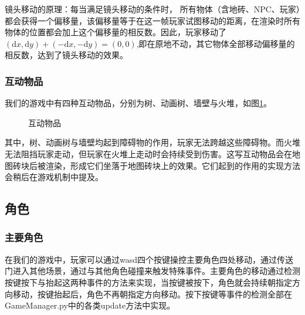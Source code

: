 \documentclass{ctexart}
\begin{document}
镜头移动的原理：每当满足镜头移动的条件时， 所有物体（含地砖、NPC、玩家）都会获得一个偏移量，该偏移量等于在这一帧玩家试图移动的距离，在渲染时所有物体的位置都会加上这个偏移量的相反数。因此，玩家移动了$\left ( \mathrm{d}x,\mathrm{d}y \right ) +  \left ( -\mathrm{d}x,-\mathrm{d}y \right )= \left ( 0,0 \right )$,即在原地不动，其它物体全部移动偏移量的相反数，达到了镜头移动的效果。 

\subsubsection{互动物品}
我们的游戏中有四种互动物品，分别为树、动画树、墙壁与火堆，如图\ref{fig:互动物品}。
\begin{figure}[h]
\centering
{}
\caption{\label{fig:互动物品}互动物品}
\end{figure}

其中，树、动画树与墙壁均起到障碍物的作用，玩家无法跨越这些障碍物。而火堆无法阻挡玩家走动，但玩家在火堆上走动时会持续受到伤害。这写互动物品会在地图砖块后被渲染，形成它们坐落于地图砖块上的效果。它们起到的作用的实现方法会稍后在游戏机制中提及。

\subsection{角色}
\subsubsection{主要角色}
在我们的游戏中，玩家可以通过wasd四个按键操控主要角色四处移动，通过传送门进入其他场景，通过与其他角色碰撞来触发特殊事件。主要角色的移动通过检测按键按下与抬起这两种事件的方法来实现，当按键被按下，角色就会持续朝指定方向移动，按键抬起后，角色不再朝指定方向移动。按下按键等事件的检测全部在GameManager.py中的各类update方法中实现。
\end{document}
